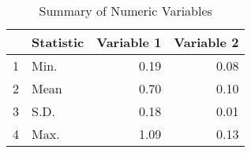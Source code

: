 \begin{table}[ht]
\centering
\begin{tabular}{rlrr}
  \hline
 & Statistic & Variable 1 & Variable 2 \\
  \hline
  1 & Min. & 0.19 & 0.08 \\
  2 & Mean & 0.70 & 0.10 \\
  3 & S.D. & 0.18 & 0.01 \\
  4 & Max. & 1.09 & 0.13 \\
   \hline
\end{tabular}
\caption{Summary of Numeric Variables}
\label{tab:summary}
\end{table}